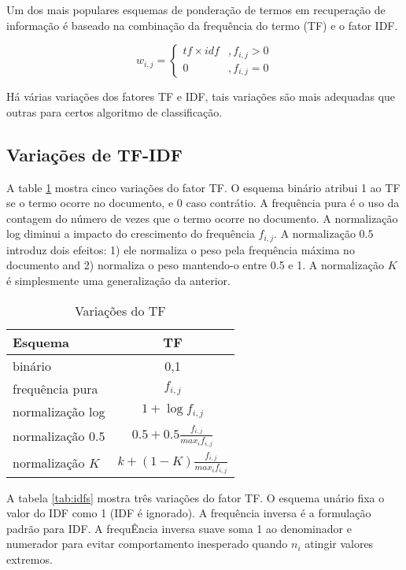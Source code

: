 \documentclass[]{article}
\begin{document}
Um dos mais populares esquemas de ponderação de termos em recuperação de
informação é baseado na combinação da frequência do termo (TF) e o fator
IDF.

\begin{equation}
    w_{i,j}=\left\{
                \begin{array}{ll}
                  tf \times idf &, f_{i,j} > 0\\
                  0 &, f_{i,j} = 0
                \end{array}
              \right.
\end{equation}

Há várias variações dos fatores TF e IDF, tais variações são mais
adequadas que outras para certos algoritmo de classificação.

\subsection{Variações de TF-IDF}\label{variacoes-de-tf-idf}

A table \ref{tab:tfs} mostra cinco variações do fator TF. O esquema
binário atribui 1 ao TF se o termo ocorre no documento, e 0 caso
contrátio. A frequência pura é o uso da contagem do número de vezes que
o termo ocorre no documento. A normalização log diminui a impacto do
crescimento do frequência \(f_{i,j}\). A normalização \(0.5\) introduz
dois efeitos: 1) ele normaliza o peso pela frequência máxima no
documento and 2) normaliza o peso mantendo-o entre 0.5 e 1. A
normalização \(K\) é simplesmente uma generalização da anterior.

\begin{table}[ht]
\centering
\begin{tabular}{|lc|}
\hline
  Esquema & TF\\ 
\hline
binário & {0,1}\\
frequência pura & $f_{i,j}$\\
normalização log & $1 + \log f_{i,j}$\\
normalização $0.5$ & $0.5 + 0.5  \frac{f_{i,j}}{max_if_{i,j}}$\\
normalização $K$ & $k + (1-K) \frac{f_{i,j}}{max_if_{i,j}}$\\
\hline
\end{tabular}
\label{tab:tfs}
\caption{Variações do TF}
\end{table}

A tabela \ref{tab:idfs} mostra três variações do fator TF. O esquema
unário fixa o valor do IDF como 1 (IDF é ignorado). A frequência inversa
é a formulação padrão para IDF. A frequÊncia inversa suave soma 1 ao
denominador e numerador para evitar comportamento inesperado quando
\(n_i\) atingir valores extremos.
\end{document}
